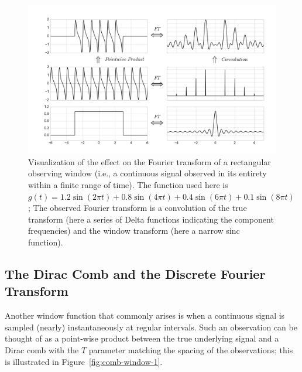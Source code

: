 \documentclass[preprint]{aastex}
\newcommand{\fig}[1]{Figure~\ref{fig:#1}}
\newcommand{\figlabel}[1]{\label{fig:#1}}
\begin{document}
\begin{figure}[ht]
  \centering
  \includegraphics[width=\textwidth]{fig06_Rectangular_Window}
  \caption{Visualization of the effect on the Fourier transform of a
    rectangular observing window (i.e., a continuous signal observed in its
    entirety within a finite range of time). The function used here is
    $g(t) = 1.2\sin(2\pi t) + 0.8\sin(4\pi t) + 0.4\sin(6\pi t) + 0.1\sin(8\pi t)$; The observed Fourier
    transform is a convolution of the true transform (here a series of Delta
    functions indicating the component frequencies) and the window transform
    (here a narrow sinc function).
    \figlabel{rectangular-window}}
\end{figure}

\subsection{The Dirac Comb and the Discrete Fourier Transform}
Another window function that commonly arises is when a continuous signal is
sampled (nearly) instantaneously at regular intervals.
Such an observation can be thought of as a point-wise product between the true
underlying signal and a Dirac comb with the $T$ parameter matching the spacing
of the observations; this is illustrated in \fig{comb-window-1}.
\end{document}
